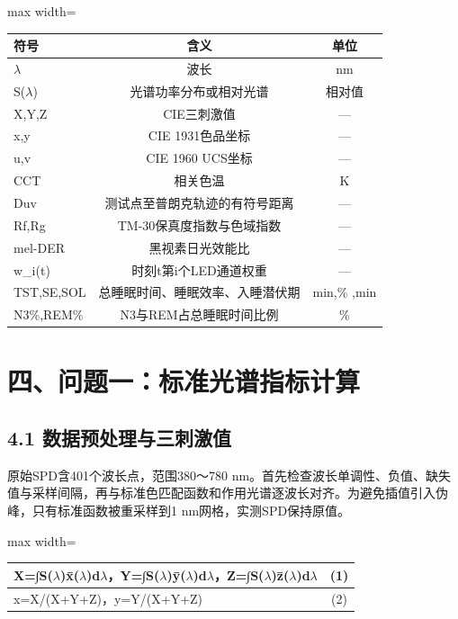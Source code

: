 \documentclass[UTF8,a4paper,12pt]{ctexart}
\begin{document}
\begin{table}[H]
\centering
\small
\begin{adjustbox}{max width=\textwidth}
\begin{tabular}{lcc}
\toprule
符号 & 含义 & 单位 \\
\midrule
$\lambda$ & 波长 & nm \\
S($\lambda$) & 光谱功率分布或相对光谱 & 相对值 \\
X,Y,Z & CIE三刺激值 & — \\
x,y & CIE 1931色品坐标 & — \\
u,v & CIE 1960 UCS坐标 & — \\
CCT & 相关色温 & K \\
Duv & 测试点至普朗克轨迹的有符号距离 & — \\
Rf,Rg & TM-30保真度指数与色域指数 & — \\
mel-DER & 黑视素日光效能比 & — \\
w\_i(t) & 时刻t第i个LED通道权重 & — \\
TST,SE,SOL & 总睡眠时间、睡眠效率、入睡潜伏期 & min,\% ,min \\
N3\%,REM\% & N3与REM占总睡眠时间比例 & \% \\
\bottomrule
\end{tabular}
\end{adjustbox}
\end{table}

\section{四、问题一：标准光谱指标计算}

\subsection{4.1 数据预处理与三刺激值}

原始SPD含401个波长点，范围380～780 nm。首先检查波长单调性、负值、缺失值与采样间隔，再与标准色匹配函数和作用光谱逐波长对齐。为避免插值引入伪峰，只有标准函数被重采样到1 nm网格，实测SPD保持原值。

\begin{table}[H]
\centering
\small
\begin{adjustbox}{max width=\textwidth}
\begin{tabular}{lc}
\toprule
X=∫S($\lambda$)x̄($\lambda$)d$\lambda$，Y=∫S($\lambda$)ȳ($\lambda$)d$\lambda$，Z=∫S($\lambda$)z̄($\lambda$)d$\lambda$ & (1) \\
\midrule
x=X/(X+Y+Z)，y=Y/(X+Y+Z) & (2) \\
\bottomrule
\end{tabular}
\end{adjustbox}
\end{table}
\end{document}
